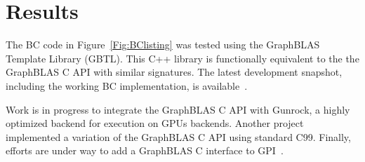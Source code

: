 \section{Results}
\label{sec:results}

The BC code in Figure~\ref{Fig:BClisting} 
was tested using the GraphBLAS Template Library (GBTL)\cite{gbtl-cuda16}. This 
C++ library is functionally equivalent to the the GraphBLAS C
API with similar signatures.  The latest development snapshot, 
including the working BC implementation, is available~\cite{gbtl-github}. 

Work is in progress to integrate the GraphBLAS C API 
with Gunrock\cite{topc17}, a highly optimized backend for execution 
on GPUs backends.  Another project~\cite{cook} implemented a variation
of the GraphBLAS C API using standard C99.
Finally, efforts are under way to add a GraphBLAS C interface to GPI~\cite{gpi2016}.

